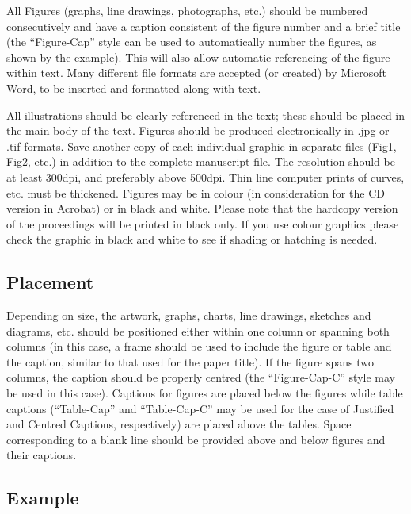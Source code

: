 \documentclass[bibtex,pagenumbers]{stabs2021}
\begin{document}
All Figures (graphs, line drawings, photographs, etc.) should be
numbered consecutively and have a caption consistent of the figure
number and a brief title (the “Figure-Cap” style can be used to
automatically number the figures, as shown by the example). This will
also allow automatic referencing of the figure within text. Many
different file formats are accepted (or created) by Microsoft Word,
to be inserted and formatted along with text.

All illustrations should be clearly referenced in the text; these
should be placed in the main body of the text.  Figures should be
produced electronically in .jpg or .tif formats. Save another copy of
each individual graphic in separate files (Fig1, Fig2, etc.) in
addition to the complete manuscript file. The resolution should be at
least 300dpi, and preferably above 500dpi. Thin line computer prints
of curves, etc. must be thickened. Figures may be in colour (in
consideration for the CD version in Acrobat) or in black and
white. Please note that the hardcopy version of the proceedings will
be printed in black only. If you use colour graphics please check the
graphic in black and white to see if shading or hatching is needed.

\subsection{Placement}

Depending on size, the artwork, graphs, charts, line drawings,
sketches and diagrams, etc. should be positioned either within one
column or spanning both columns (in this case, a frame should be used
to include the figure or table and the caption, similar to that used
for the paper title). If the figure spans two columns, the caption
should be properly centred (the “Figure-Cap-C” style may be used in
this case). Captions for figures are placed below the figures while
table captions (“Table-Cap” and “Table-Cap-C” may be used for the case
of Justified and Centred Captions, respectively) are placed above the
tables. Space corresponding to a blank line should be provided above
and below figures and their captions.

\subsection{Example}
\end{document}
